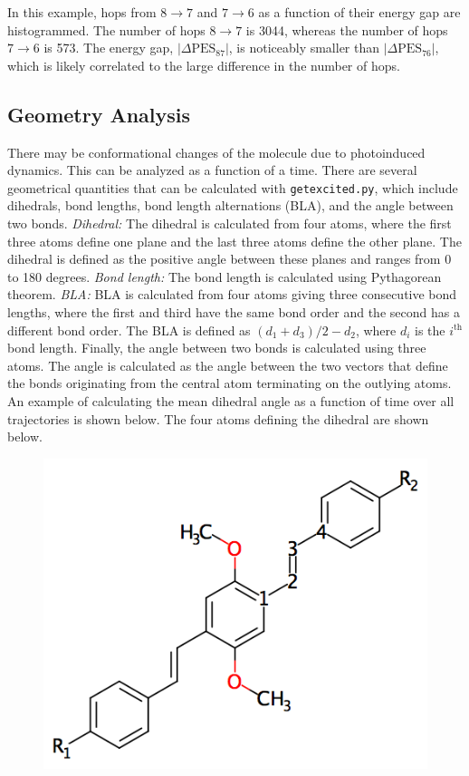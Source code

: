 \documentclass[letterpaper,12pt,titlepage]{article}
\begin{document}
In this example, hops from $8\rightarrow7$ and $7\rightarrow6$ as a function of their energy gap are histogrammed.  The number of hops $8\rightarrow7$ is 3044, whereas the number of hops $7\rightarrow6$ is 573.  The energy gap, $|\Delta\text{PES}_{87}|$, is noticeably smaller than $|\Delta\text{PES}_{76}|$, which is likely correlated to the large difference in the number of hops.

\subsection{Geometry Analysis}
There may be conformational changes of the molecule due to photoinduced dynamics.  This can be analyzed as a function of a time.  There are several geometrical quantities that can be calculated with \verb+getexcited.py+, which include dihedrals, bond lengths, bond length alternations (BLA), and the angle between two bonds.  \textit{Dihedral:} The dihedral is calculated from four atoms, where the first three atoms define one plane and the last three atoms define the other plane.  The dihedral is defined as the positive angle between these planes and ranges from 0 to 180 degrees.  \textit{Bond length:} The bond length is calculated using Pythagorean theorem.  \textit{BLA:} BLA is calculated from four atoms giving three consecutive bond lengths, where the first and third have the same bond order and the second has a different bond order.  The BLA is defined as $\left(d_{1}+d_{3}\right)/2 - d_{2}$, where $d_{i}$ is the $i^{\text{th}}$ bond length.  Finally, the angle between two bonds is calculated using three atoms.  The angle is calculated as the angle between the two vectors that define the bonds originating from the central atom terminating on the outlying atoms.  An example of calculating the mean dihedral angle as a function of time over all trajectories is shown below.  The four atoms defining the dihedral are shown below.
\begin{figure}[h]
	\centering 
	\includegraphics[scale=.50]{asymm_dihedral.png}
\end{figure}
\end{document}
